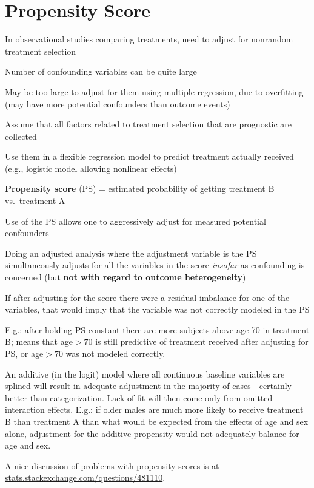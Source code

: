 \section{Propensity Score}\label{sec:propens}
\bi
\item In observational studies comparing treatments, need to adjust
  for nonrandom treatment selection
\item Number of confounding variables can be quite large
\item May be too large to adjust for them using multiple regression,
  due to overfitting (may have more potential confounders than 
  outcome events)
\item Assume that all factors related to treatment selection that are
  prognostic are collected
\item Use them in a flexible regression model to predict treatment
  actually received (e.g., logistic model allowing nonlinear effects)
\item \textbf{Propensity score} (PS) = estimated probability of getting
  treatment B vs.\ treatment A
\item Use of the PS allows one to aggressively adjust for measured
  potential confounders
\item Doing an adjusted analysis where the adjustment variable is the
  PS simultaneously adjusts for all the variables in the
  score \emph{insofar} as confounding is concerned
  (but \textbf{not with regard to outcome heterogeneity})
\item If after adjusting for the score there were a residual imbalance
  for one of the variables, that would imply that the variable was
  not correctly modeled in the PS
\item E.g.: after holding PS constant there are more subjects above
  age 70 in treatment B; means that age$>70$ is still predictive of
  treatment received after adjusting for PS, or age$>70$ was not
  modeled correctly.
\item An additive (in the logit) model where all continuous baseline
  variables are splined will result in adequate adjustment in the
  majority of cases---certainly better than categorization.  Lack of
  fit will then come only from omitted interaction effects.  E.g.: if
  older males are much more likely to receive treatment B than
  treatment A than what would be expected from the effects of age and
  sex alone, adjustment for the additive propensity would not
  adequately balance for age and sex. 
  \ei

A nice discussion of problems with propensity scores is at \href{https://stats.stackexchange.com/questions/481110}{stats.stackexchange.com/questions/481110}.

